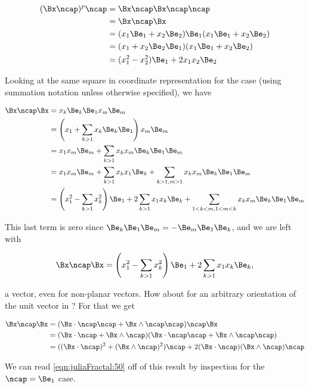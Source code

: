 \begin{align*}
(\Bx \ncap)^p \ncap 
&= \Bx \ncap \Bx \ncap \ncap \\
&= \Bx \ncap \Bx \\
&= 
(
x_1 \Be_1 
+ x_2 \Be_2  )
\Be_1
(
x_1 \Be_1 
+ x_2 \Be_2  ) \\
&= 
(
x_1 
+ x_2 \Be_2 \Be_1 )
(
x_1 \Be_1 
+ x_2 \Be_2  ) \\
&= 
(
x_1^2 - x_2^2 ) \Be_1 + 2 x_1 x_2 \Be_2
\end{align*}

Looking at the same square in coordinate representation for the  case (using summation notation unless otherwise specified), we have

\begin{align*}
\Bx \ncap \Bx 
&= 
x_k \Be_k 
\Be_1
x_m \Be_m  \\
&= 
\left(x_1 + \sum_{k>1} x_k \Be_k \Be_1\right)
x_m \Be_m  \\
&= 
x_1 x_m \Be_m 
+
\sum_{k>1} x_k x_m \Be_k \Be_1 \Be_m \\
&= 
x_1 x_m \Be_m 
+
\sum_{k>1} x_k x_1 \Be_k 
+\sum_{k>1,m>1} x_k x_m \Be_k \Be_1 \Be_m \\
&= 
\left(x_1^2 
-\sum_{k>1} x_k^2\right) \Be_1
+
2 \sum_{k>1} x_1 x_k \Be_k 
+\sum_{1 < k < m, 1 < m < k} x_k x_m \Be_k \Be_1 \Be_m \\
\end{align*}

This last term is zero since $\Be_k \Be_1 \Be_m = -\Be_m \Be_1 \Be_k$, and we are left with

\begin{equation}\label{eqn:juliaFractal:50}
\Bx \ncap \Bx =
\left(x_1^2 
-\sum_{k>1} x_k^2\right) \Be_1
+
2 \sum_{k>1} x_1 x_k \Be_k,
\end{equation}

a vector, even for non-planar vectors.  How about for an arbitrary orientation of the unit vector in ?  For that we get

\begin{align*}
\Bx \ncap \Bx 
&=
(\Bx \cdot \ncap \ncap + \Bx \wedge \ncap \ncap ) \ncap \Bx  \\
&=
(\Bx \cdot \ncap + \Bx \wedge \ncap ) (\Bx \cdot \ncap \ncap + \Bx \wedge \ncap \ncap ) 
  \\
&=
((\Bx \cdot \ncap)^2 + (\Bx \wedge \ncap)^2) \ncap
+ 2 (\Bx \cdot \ncap) (\Bx \wedge \ncap) \ncap
\end{align*}

We can read \ref{eqn:juliaFractal:50} off of this result by inspection for the $\ncap = \Be_1$ case.

